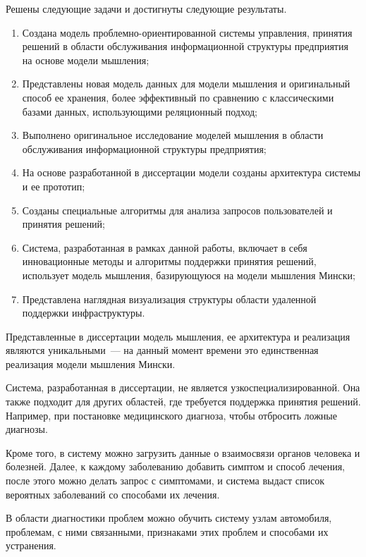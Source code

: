 
Решены следующие задачи и достигнуты следующие результаты.
\begin{enumerate}
  \item Создана модель проблемно-ориентированной системы управления, принятия решений в области обслуживания информационной структуры предприятия на основе модели мышления;
  \item Представлены новая модель данных для модели мышления и оригинальный способ ее хранения, более эффективный по сравнению с классическими базами данных, использующими реляционный подход;
  \item Выполнено оригинальное исследование моделей мышления в области обслуживания информационной структуры предприятия;
  \item На основе разработанной в диссертации модели созданы архитектура системы и ее прототип; 
  \item Созданы специальные алгоритмы для анализа запросов пользователей и принятия решений;
  \item Система, разработанная в рамках данной работы, включает в себя инновационные методы и алгоритмы поддержки принятия решений, использует модель мышления, базирующуюся на модели мышления Мински;
  \item Представлена наглядная визуализация структуры области удаленной поддержки инфраструктуры.
\end{enumerate}

Представленные в диссертации модель мышления, ее архитектура и реализация являются уникальными~--- на данный момент времени это единственная реализация модели мышления Мински. \par
Система, разработанная в диссертации, не является узкоспециализированной. Она также подходит для других областей, где требуется поддержка принятия решений. Например, при постановке медицинского диагноза, чтобы отбросить ложные диагнозы. \par
Кроме того, в систему можно загрузить данные о взаимосвязи органов человека и болезней. Далее, к каждому заболеванию добавить симптом и способ лечения, после этого можно делать запрос с симптомами, и система выдаст список вероятных заболеваний со способами их лечения. \par
В области диагностики проблем можно обучить систему узлам автомобиля, проблемам, с ними связанными, признаками этих проблем и способами их устранения. 



